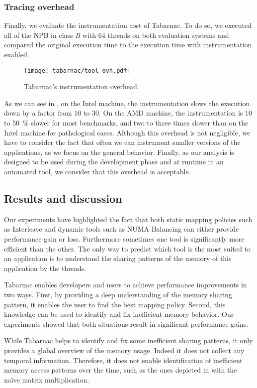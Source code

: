 \subsubsection{Tracing overhead}

Finally,  we evaluate the instrumentation cost of \gls{Tabarnac}.
To do so, we executed all of the \gls{NPB} in class \emph{B} with $64$ threads on both evaluation systems and compared the original execution time to the execution time with instrumentation enabled.

\begin{figure}[htb]
    \centering
    \texttt{[image: tabarnac/tool-ovh.pdf]}
    \caption{Tabarnac's instrumentation overhead.}
    \label{fig:ovh-tabarnac}
\end{figure}

As we can see in , on the Intel machine, the instrumentation slows the execution down by a factor from $10$ to $30$.
On the \gls{AMD} machine, the instrumentation is $10$ to \SI{50}{\%} slower for most benchmarks, and two to three times slower than on the \gls{Intel} machine for pathological cases.
Although this overhead is not negligible, we have to consider the fact that often we can instrument smaller versions of the applications, as we focus on the general behavior.
Finally, as our analysis is designed to be used during the development phase and at runtime in an automated tool, we consider that this overhead is acceptable.


\subsection{Results and discussion}

Our experiments have highlighted the fact that both static mapping policies such as Interleave and dynamic tools such as \gls{NUMA} Balancing can either provide performance gain or loss.
Furthermore sometimes one tool is significantly more efficient than the other.
The only way to predict which tool is the most suited to an application is to understand the sharing patterns of the memory of this application by the threads.

\gls{Tabarnac} enables developers and users to achieve performance improvements in two ways.
First, by providing a deep understanding of the memory sharing pattern, it enables the user to find the best mapping policy.
Second, this knowledge can be used to identify and fix inefficient memory behavior.
Our experiments showed that both situations result in significant performance gains.

While \gls{Tabarnac} helps to identify and fix some inefficient sharing patterns, it only provides a global overview of the memory usage.
Indeed it does not collect any temporal information.
Therefore, it does not enable identification of inefficient memory access patterns over the time, such as the ones depicted in  with the naïve matrix multiplication.

